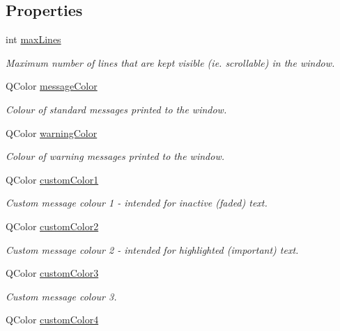 \subsection*{Properties}
\begin{DoxyCompactItemize}
\item 
int \hyperlink{class_console_widget_afef59d721756f56c09780682aa0e7fac}{max\-Lines}
\begin{DoxyCompactList}\small\item\em Maximum number of lines that are kept visible (ie. scrollable) in the window. \end{DoxyCompactList}\item 
Q\-Color \hyperlink{class_console_widget_a2c801d4bdb2605d0d4fcf2812b0f33fc}{message\-Color}
\begin{DoxyCompactList}\small\item\em Colour of standard messages printed to the window. \end{DoxyCompactList}\item 
Q\-Color \hyperlink{class_console_widget_ac0fe2ed854169ca40a506eef06dd7627}{warning\-Color}
\begin{DoxyCompactList}\small\item\em Colour of warning messages printed to the window. \end{DoxyCompactList}\item 
Q\-Color \hyperlink{class_console_widget_a18db5e08e8bcd6af5a8f88af6277ada7}{custom\-Color1}
\begin{DoxyCompactList}\small\item\em Custom message colour 1 -\/ intended for inactive (faded) text. \end{DoxyCompactList}\item 
Q\-Color \hyperlink{class_console_widget_a31515e30c85421da91c99274f0904eb6}{custom\-Color2}
\begin{DoxyCompactList}\small\item\em Custom message colour 2 -\/ intended for highlighted (important) text. \end{DoxyCompactList}\item 
Q\-Color \hyperlink{class_console_widget_a503ef241a14e2e2990e254bc3e406d66}{custom\-Color3}
\begin{DoxyCompactList}\small\item\em Custom message colour 3. \end{DoxyCompactList}\item 
Q\-Color \hyperlink{class_console_widget_aa0a5471af07f6a8601cef118d12aea10}{custom\-Color4}

\end{DoxyCompactItemize}

